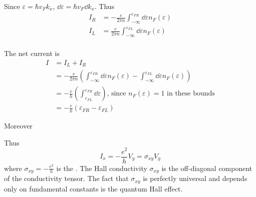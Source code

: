 \documentclass[12pt,a4paper,titlepage]{article}
\newcommand{\trm}[1]{\textrm{#1}} %
\newcommand{\ul}[1]{\underline{\smash{#1}}} %
\begin{document}
Since $\varepsilon=\hbar v_{F}k_{x}$, $\dd{\varepsilon}=\hbar v_{F}\dd{k_{x}}$. Thus
\begin{equation}
\begin{aligned}
I_{R}&=-\frac{e}{2\pi n}\int_{-\infty}^{\varepsilon_{FR}}\dd{\varepsilon}n_{F}(\varepsilon)\\
I_{L}&=\frac{e}{2\pi n}\int_{-\infty}^{\varepsilon_{FL}}\dd{\varepsilon}n_{F}(\varepsilon)\\
\end{aligned}
\end{equation}

\begin{center}
\end{center}

The net current is
\begin{equation}
\begin{aligned}
I&=I_{L}+I_{R}\\
&=-\frac{e}{2\pi n}\left(\int_{-\infty}^{\varepsilon_{FR}}\dd{\varepsilon}n_{F}(\varepsilon)-\int_{-\infty}^{\varepsilon_{FL}}\dd{\varepsilon}n_{F}(\varepsilon)\right)\\
&=-\frac{e}{h}\left(\int_{\varepsilon_{FL}}^{\varepsilon_{FR}}\dd{\varepsilon}\right)\trm{, since $n_{F}(\varepsilon)=1$ in these bounds}\\
&=-\frac{e}{h}(\varepsilon_{FR}-\varepsilon_{FL})
\end{aligned}
\end{equation}

\newpage
Moreover
\begin{center}
\end{center}

Thus
\begin{equation}
I_{x}=-\frac{e^{2}}{h}V_{y}=\sigma_{xy}V_{y}
\end{equation}
where $\sigma_{xy}=-\frac{e^{2}}{h}$ is the \ul{Hall conductivity}. The Hall conductivity $\sigma_{xy}$ is the off-diagonal component of the conductivity tensor. The fact that $\sigma_{xy}$ is perfectly universal and depends only on fundamental constants is the quantum Hall effect.\\
\end{document}
